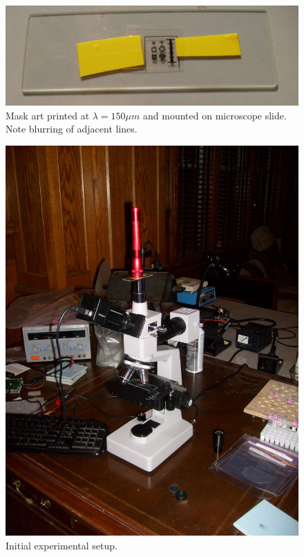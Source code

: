 \documentclass[twocolumn]{article}
\begin{document}
\begin{figure}[h]
\begin{center}
\includegraphics[scale=0.1]{mask-art-2.jpg}
\end{center}
\caption{Mask art printed at $\lambda = 150 \mu m$ and mounted on microscope slide. Note blurring of adjacent lines.}
\label{mask-art-2}
\end{figure}

\begin{figure}[h]
\begin{center}
\includegraphics[scale=0.1]{first-test.jpg}
\end{center}
\caption{Initial experimental setup.}
\label{first-test}
\end{figure}
\end{document}
